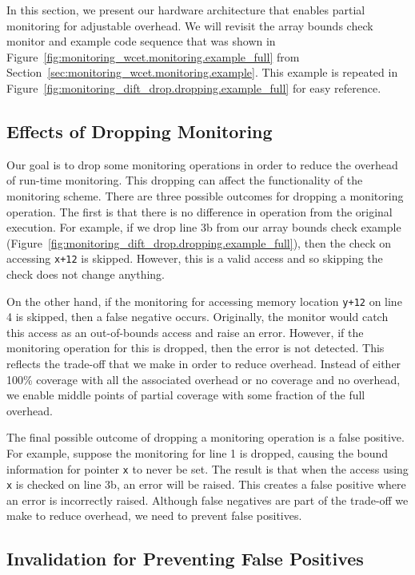 In this section, we present our hardware architecture that enables partial
monitoring for adjustable overhead. We will revisit the array bounds check
monitor and example code sequence that was shown in
Figure~\ref{fig:monitoring_wcet.monitoring.example_full} from
Section~\ref{sec:monitoring_wcet.monitoring.example}. This example is repeated
in Figure~\ref{fig:monitoring_dift_drop.dropping.example_full} for easy
reference.

\subsection{Effects of Dropping Monitoring}
\label{sec:monitoring_dift_drop.dropping.false_neg_pos}

Our goal is to drop some monitoring operations in order to reduce the overhead
of run-time monitoring. This dropping can affect the functionality of the
monitoring scheme. There are three possible outcomes for dropping a monitoring
operation. The first is that there is no difference in operation from the
original execution. For example, if we drop line 3b from our array bounds check
example (Figure~\ref{fig:monitoring_dift_drop.dropping.example_full}), then the
check on accessing {\tt x+12} is skipped. However, this is a valid access and
so skipping the check does not change anything.

On the other hand, if the monitoring for accessing memory location {\tt y+12}
on line 4 is skipped, then a false negative occurs. Originally, the monitor
would catch this access as an out-of-bounds access and raise an error. However,
if the monitoring operation for this is dropped, then the error is not
detected. This reflects the trade-off that we make in order to reduce overhead.
Instead of either 100\% coverage with all the associated overhead or no
coverage and no overhead, we enable middle points of partial coverage with some
fraction of the full overhead.

The final possible outcome of dropping a monitoring operation is a false
positive.  For example, suppose the monitoring for line 1 is dropped, causing
the bound information for pointer {\tt x} to never be set. The result is that
when the access using {\tt x} is checked on line 3b, an error will be raised.
This creates a false positive where an error is incorrectly raised. Although
false negatives are part of the trade-off we make to reduce overhead, we need
to prevent false positives.

\subsection{Invalidation for Preventing False Positives}
\label{sec:monitoring_dift_drop.dropping.prevent_false_pos}

